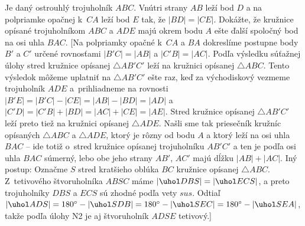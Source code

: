 {Je daný ostrouhlý trojuholník $ABC$. Vnútri strany $AB$ leží
bod $D$ a na polpriamke opačnej k~$CA$ leží bod $E$ tak, že
$|BD| = |CE|$. Dokážte, že kružnice opísané trojuholníkom $ABC$
a $ADE$ majú okrem bodu $A$ ešte ďalší spoločný bod na osi uhla $BAC$.
[Na polpriamky opačné k~$CA$ a $BA$ dokreslíme postupne body
$B'$ a $C'$ určené rovnosťami $|B'C| = |AB|$ a $|C'B| =|AC|$.
Podľa výsledku súťažnej úlohy stred kružnice opísanej
$\triangle AB'C'$ leží na kružnici opísanej
$\triangle ABC$.
Tento výsledok môžeme uplatniť na $\triangle AB'C'$ ešte raz, keď za východiskový
vezmeme trojuholník $ADE$ a~prihliadneme na rovnosti
$|B'E|={|B'C|-|CE|}={|AB|-|BD|}=|AD|$ a~$|C'D|=|C'B|+|BD|=|AC|+|CE|=|AE|$. Stred kružnice opísanej
$\triangle AB'C'$ leží preto tiež na kružnici opísanej
$\triangle ADE$. Našli sme tak priesečník kružníc opísaných
$\triangle ABC$ a $\triangle ADE$, ktorý je rôzny od bodu $A$
a ktorý leží na osi uhla~$BAC$ -- ide totiž o~stred kružnice opísanej
trojuholníku $AB'C'$ a ten je podľa osi uhla $BAC$ súmerný,
lebo obe jeho strany $AB'$, $AC'$ majú dĺžku $|AB|+|AC|$.
{Iný postup: Označme $S$ stred kratšieho oblúka $BC$ kružnice
opísanej $\triangle ABC$. Z~tetivového štvoruholníka $ABSC$ máme
$|\uhol DBS|=|\uhol ECS|$, a preto trojuholníky $DBS$ a $ECS$ sú
zhodné podľa vety $sus$. Odtiaľ
$|\uhol ADS|={180^{\circ}-|\uhol SDB|}={180^{\circ}-|\uhol SEC|}=
{180^{\circ}-|\uhol SEA|}$, takže podľa úlohy N2 je
aj štvoruholník $ADSE$ tetivový.}]

}

